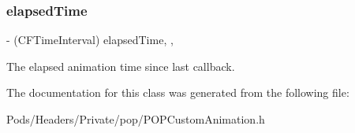 \subsubsection{\texorpdfstring{elapsed\+Time}{elapsedTime}}
{\footnotesize\ttfamily -\/ (C\+F\+Time\+Interval) elapsed\+Time\hspace{0.3cm}{\ttfamily [read]}, {\ttfamily [nonatomic]}, {\ttfamily [assign]}}

The elapsed animation time since last callback. 

The documentation for this class was generated from the following file\+:\begin{DoxyCompactItemize}
\item 
Pods/\+Headers/\+Private/pop/P\+O\+P\+Custom\+Animation.\+h\end{DoxyCompactItemize}
